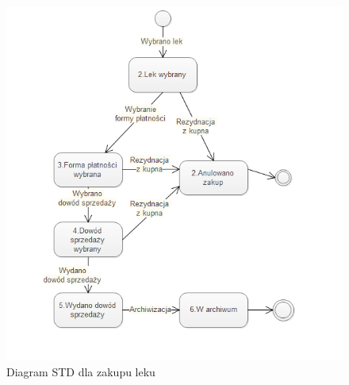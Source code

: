 \documentclass[a4paper, 11pt]{article}
\begin{document}
	\begin{figure}[H]
\centerline{\includegraphics[scale=1]{STDzakup.png}}
\caption{Diagram STD dla zakupu leku}
\end{figure}
\end{document}
